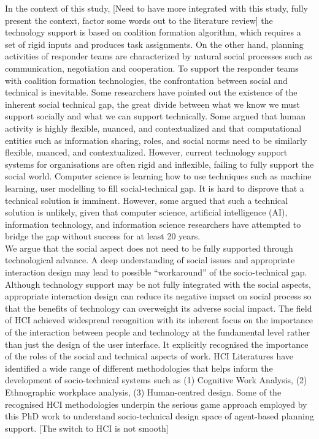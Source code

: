 In the context of this study, [Need to have more integrated with this study, fully present the context, factor some words out to the literature review] the technology support is based on coalition formation algorithm, which requires a set of rigid inputs and produces task assignments. On the other hand, planning activities of responder teams are characterized by natural social processes such as communication, negotiation and cooperation. To support the responder teams with coalition formation technologies, the confrontation between social and technical is inevitable. Some researchers have pointed out the existence of the inherent social technical gap, the great divide between what we know we must support socially and what we can support technically.  Some argued that human activity is highly flexible, nuanced, and contextualized and that computational entities such as information sharing, roles, and social norms need to be similarly flexible, nuanced, and contextualized. However, current technology support systems for organisations are often rigid and inflexible, failing to fully support the social world. Computer science is learning how to use techniques such as machine learning, user modelling to fill social-technical gap. It is hard to disprove that a technical solution is imminent. However, some argued that such a technical solution is unlikely, given that computer science, artificial intelligence (AI), information technology, and information science researchers have attempted to bridge the gap without success for at least 20 years. \\

We argue that the social aspect does not need to be fully supported through technological advance. A deep understanding of social issues and appropriate interaction design may lead to possible ``workaround'' of the socio-technical gap. Although technology support may be not fully integrated with the social aspects, appropriate interaction design can reduce its negative impact on social process so that the benefits of technology can overweight its adverse social impact. The field of HCI achieved widespread recognition with its inherent focus on the importance of the interaction between people and technology at the fundamental level rather than just the design of the user interface. It explicitly recognised the importance of the roles of the social and technical aspects of work. HCI Literatures have identified a wide range of different methodologies that helps inform the development of socio-technical systems such as (1) Cognitive Work Analysis, (2) Ethnographic workplace analysis, (3) Human-centred design. Some of the recognised HCI methodologies underpin the serious game approach employed by this PhD work to understand socio-technical design space of agent-based planning support. [The switch to HCI is not smooth]\\

